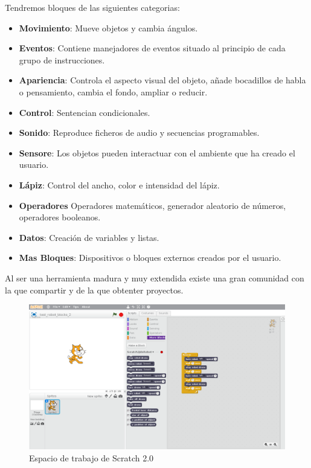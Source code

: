 Tendremos bloques de las siguientes categorias:
\begin{itemize}
\item \textbf{Movimiento}: Mueve objetos y cambia ángulos.	  	 	
\item \textbf{Eventos}: Contiene manejadores de eventos situado al principio de cada grupo de instrucciones.
\item \textbf{Apariencia}: Controla el aspecto visual del objeto, añade bocadillos de habla o 
pensamiento, cambia el fondo, ampliar o reducir.	 	
\item \textbf{Control}: Sentencian condicionales.
\item \textbf{Sonido}: Reproduce ficheros de audio y secuencias programables.	 	
\item \textbf{Sensore}: Los objetos pueden interactuar con el ambiente que ha creado el usuario.
\item \textbf{Lápiz}: Control del ancho, color e intensidad del lápiz.	 	
\item \textbf{Operadores} Operadores matemáticos, generador aleatorio de números, operadores booleanos.
\item \textbf{Datos}: Creación de variables y listas.	 	
\item \textbf{Mas Bloques}: Dispositivos o bloques externos creados por el usuario.
\end{itemize}

Al ser una herramienta madura y muy extendida existe una gran comunidad con la que compartir y de la que obtenter proyectos.

\begin{figure}[H]
    \centering
    \includegraphics[scale=0.32]{img/scratch_IDE.png}
  	\caption{Espacio de trabajo de Scratch 2.0}
  	\label{fig:gazebo}
\end{figure}

